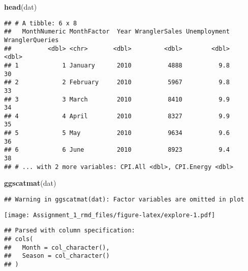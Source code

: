 \documentclass[]{article}
\newenvironment{Shaded}{\begin{snugshade}}{\end{snugshade}}
\newcommand{\KeywordTok}[1]{\textcolor[rgb]{0.13,0.29,0.53}{\textbf{#1}}}
\newcommand{\DataTypeTok}[1]{\textcolor[rgb]{0.13,0.29,0.53}{#1}}
\newcommand{\StringTok}[1]{\textcolor[rgb]{0.31,0.60,0.02}{#1}}
\newcommand{\OperatorTok}[1]{\textcolor[rgb]{0.81,0.36,0.00}{\textbf{#1}}}
\newcommand{\NormalTok}[1]{#1}
\begin{document}
\begin{Shaded}
\begin{Highlighting}[]
\KeywordTok{head}\NormalTok{(dat)}
\end{Highlighting}
\end{Shaded}

\begin{verbatim}
## # A tibble: 6 x 8
##   MonthNumeric MonthFactor  Year WranglerSales Unemployment WranglerQueries
##          <dbl> <chr>       <dbl>         <dbl>        <dbl>           <dbl>
## 1            1 January      2010          4888          9.8              30
## 2            2 February     2010          5967          9.8              33
## 3            3 March        2010          8410          9.9              34
## 4            4 April        2010          8327          9.9              35
## 5            5 May          2010          9634          9.6              36
## 6            6 June         2010          8923          9.4              38
## # ... with 2 more variables: CPI.All <dbl>, CPI.Energy <dbl>
\end{verbatim}

\begin{Shaded}
\begin{Highlighting}[]
\KeywordTok{ggscatmat}\NormalTok{(dat)}
\end{Highlighting}
\end{Shaded}

\begin{verbatim}
## Warning in ggscatmat(dat): Factor variables are omitted in plot
\end{verbatim}

\texttt{[image: Assignment\_1\_rmd\_files/figure-latex/explore-1.pdf]}

\begin{Shaded}
\end{Shaded}

\begin{verbatim}
## Parsed with column specification:
## cols(
##   Month = col_character(),
##   Season = col_character()
## )
\end{verbatim}
\end{document}
